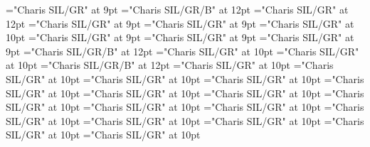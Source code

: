 \documentclass[gps1,twoside]{article}
\begin{document}
\font\nontrivialentryrootscomplexformsnotsubentrycomplexformsnotsubentriessubentrysubentriesentryafter="Charis SIL/GR" at 9pt
\font\nontrivialentryrootnontrivialentryrootscomplexformsnotsubentrycomplexformsnotsubentriessubentrysubentriesentry="Charis SIL/GR/B" at 12pt
\font\picturepicturessubentrysubentriesentry="Charis SIL/GR" at 12pt
\font\spanspanpicturessubentrysubentriesentrybefore="Charis SIL/GR" at 9pt
\font\picturessubentrysubentriesentryafter="Charis SIL/GR" at 9pt
\font\picturepicturessubentrysubentriesentry="Charis SIL/GR" at 10pt
\font\picturepicturessubentrysubentriesentryafter="Charis SIL/GR" at 9pt
\font\spanspancaptionpicturepicturessubentrysubentriesentrybefore="Charis SIL/GR" at 9pt
\font\subentriessubentrysubentriesentryafter="Charis SIL/GR" at 9pt
\font\spanbzhheadwordminorentrycomplex="Charis SIL/GR/B" at 12pt
\font\spanspanheadwordminorentrycomplexbefore="Charis SIL/GR" at 10pt
\font\spanheadwordminorentrycomplexlastchildafter="Charis SIL/GR" at 10pt
\font\spanheadwordminorentrycomplex="Charis SIL/GR/B" at 12pt
\font\pronunciationpronunciationpronunciationsminorentrycomplexbefore="Charis SIL/GR" at 10pt
\font\pronunciationsminorentrycomplexafter="Charis SIL/GR" at 10pt
\font\spanspanformpronunciationpronunciationsminorentrycomplexbefore="Charis SIL/GR" at 10pt
\font\spanformpronunciationpronunciationsminorentrycomplexfirstchildbefore="Charis SIL/GR" at 10pt
\font\spanformpronunciationpronunciationsminorentrycomplexlastchildafter="Charis SIL/GR" at 10pt
\font\spanspanvariantformentrybackrefsminorentrycomplexbefore="Charis SIL/GR" at 10pt
\font\variantformentrybackrefsminorentrycomplexbefore="Charis SIL/GR" at 10pt
\font\variantformentrybackrefsminorentrycomplexafter="Charis SIL/GR" at 10pt
\font\variantentrytypevariantentrytypevariantentrytypesvariantformentrybackrefvariantformentrybackrefsminorentrycomplexbefore="Charis SIL/GR" at 10pt
\font\variantentrytypesvariantformentrybackrefvariantformentrybackrefsminorentrycomplexafter="Charis SIL/GR" at 10pt
\font\spanspanreverseabbrvariantentrytypevariantentrytypesvariantformentrybackrefvariantformentrybackrefsminorentrycomplexbefore="Charis SIL/GR" at 10pt
\font\spanreverseabbrvariantentrytypevariantentrytypesvariantformentrybackrefvariantformentrybackrefsminorentrycomplexlastchildafter="Charis SIL/GR" at 10pt
\font\spanspanheadwordvariantformentrybackrefvariantformentrybackrefsminorentrycomplexbefore="Charis SIL/GR" at 10pt
\font\spanspanowningentrysummarydefinitionvariantformentrybackrefvariantformentrybackrefsminorentrycomplexbefore="Charis SIL/GR" at 10pt
\font\spanowningentrysummarydefinitionvariantformentrybackrefvariantformentrybackrefsminorentrycomplexlastchildafter="Charis SIL/GR" at 10pt
\end{document}
